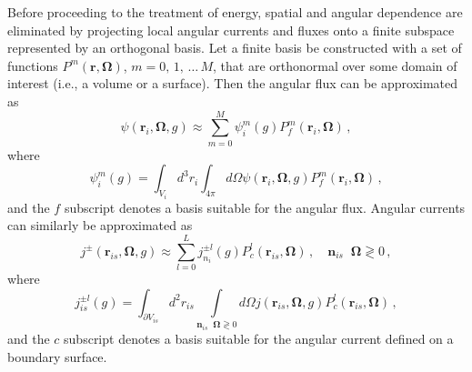 \documentclass[5p,times,twocolumn,10pt]{elsarticle}
\DeclareMathOperator*{\dotp}{{\scriptscriptstyle \stackrel{\bullet}{{}}}}
\begin{document}
    Before proceeding to the treatment of energy, spatial and angular 
dependence 
    are eliminated by projecting local angular currents and fluxes onto a 
    finite subspace represented by an orthogonal basis. Let a finite basis 
    be constructed with a set of functions $P^m(\mathbf{r},\bm{\Omega})$, 
    $m=0,\, 1,\, \ldots \, M$, that are orthonormal over some domain of 
interest 
    (i.e., a volume or a surface). Then the angular flux can be approximated as
    \begin{equation}
        \psi(\mathbf{r}_i, \bm{\Omega}, g) 
        \approx \sum^M_{m=0} \psi_{i}^m(g) P^m_f(\mathbf{r}_i,\bm{\Omega}) \, ,
        \label{eq:qexpand}   
    \end{equation}
    where 
    \begin{equation}
        \psi_{i}^m(g) 
        = \int_{V_i}  d^3 r_i \int_{4\pi} d\Omega
        \psi(\mathbf{r}_i, \bm{\Omega}, g)  P^m_f(\mathbf{r}_i,\bm{\Omega}) \, ,
    \end{equation}
    and the $f$ subscript denotes a basis suitable for the angular flux.  
    Angular currents can similarly be approximated as 
    \begin{equation}
        j^{\pm}(\mathbf{r}_{is}, \bm{\Omega}, g) 
        \approx \sum^L_{l=0} j_{n_i}^{\pm l}(g) 
        P^l_c(\mathbf{r}_{is},\bm{\Omega}) \, , 
        \quad \mathbf{n}_{is} \dotp \bm{\Omega} \gtrless 0 \, ,
        \label{eq:jexpand}   
    \end{equation}
    where 
    \begin{equation}
        j_{is}^{\pm l}(g)
        =  \int_{\partial V_{is}} d^2 r_{is}
        \int\limits_{\mathbf{n}_{is} \dotp \bm{\Omega} \gtrless 0} d \Omega
        j(\mathbf{r}_{is}, \bm{\Omega},g)  P^l_c(\mathbf{r}_{is},\bm{\Omega}) 
\, 
        ,
    \end{equation}
    and the $c$ subscript denotes a basis suitable for the angular current 
    defined on a boundary surface.
    
\end{document}
